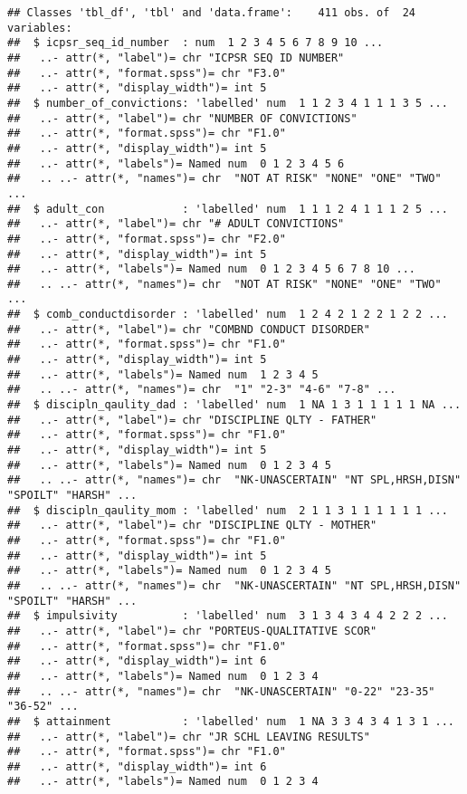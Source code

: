 \documentclass[]{tufte-handout}
\begin{document}
\begin{verbatim}
## Classes 'tbl_df', 'tbl' and 'data.frame':    411 obs. of  24 variables:
##  $ icpsr_seq_id_number  : num  1 2 3 4 5 6 7 8 9 10 ...
##   ..- attr(*, "label")= chr "ICPSR SEQ ID NUMBER"
##   ..- attr(*, "format.spss")= chr "F3.0"
##   ..- attr(*, "display_width")= int 5
##  $ number_of_convictions: 'labelled' num  1 1 2 3 4 1 1 1 3 5 ...
##   ..- attr(*, "label")= chr "NUMBER OF CONVICTIONS"
##   ..- attr(*, "format.spss")= chr "F1.0"
##   ..- attr(*, "display_width")= int 5
##   ..- attr(*, "labels")= Named num  0 1 2 3 4 5 6
##   .. ..- attr(*, "names")= chr  "NOT AT RISK" "NONE" "ONE" "TWO" ...
##  $ adult_con            : 'labelled' num  1 1 1 2 4 1 1 1 2 5 ...
##   ..- attr(*, "label")= chr "# ADULT CONVICTIONS"
##   ..- attr(*, "format.spss")= chr "F2.0"
##   ..- attr(*, "display_width")= int 5
##   ..- attr(*, "labels")= Named num  0 1 2 3 4 5 6 7 8 10 ...
##   .. ..- attr(*, "names")= chr  "NOT AT RISK" "NONE" "ONE" "TWO" ...
##  $ comb_conductdisorder : 'labelled' num  1 2 4 2 1 2 2 1 2 2 ...
##   ..- attr(*, "label")= chr "COMBND CONDUCT DISORDER"
##   ..- attr(*, "format.spss")= chr "F1.0"
##   ..- attr(*, "display_width")= int 5
##   ..- attr(*, "labels")= Named num  1 2 3 4 5
##   .. ..- attr(*, "names")= chr  "1" "2-3" "4-6" "7-8" ...
##  $ discipln_qaulity_dad : 'labelled' num  1 NA 1 3 1 1 1 1 1 NA ...
##   ..- attr(*, "label")= chr "DISCIPLINE QLTY - FATHER"
##   ..- attr(*, "format.spss")= chr "F1.0"
##   ..- attr(*, "display_width")= int 5
##   ..- attr(*, "labels")= Named num  0 1 2 3 4 5
##   .. ..- attr(*, "names")= chr  "NK-UNASCERTAIN" "NT SPL,HRSH,DISN" "SPOILT" "HARSH" ...
##  $ discipln_qaulity_mom : 'labelled' num  2 1 1 3 1 1 1 1 1 1 ...
##   ..- attr(*, "label")= chr "DISCIPLINE QLTY - MOTHER"
##   ..- attr(*, "format.spss")= chr "F1.0"
##   ..- attr(*, "display_width")= int 5
##   ..- attr(*, "labels")= Named num  0 1 2 3 4 5
##   .. ..- attr(*, "names")= chr  "NK-UNASCERTAIN" "NT SPL,HRSH,DISN" "SPOILT" "HARSH" ...
##  $ impulsivity          : 'labelled' num  3 1 3 4 3 4 4 2 2 2 ...
##   ..- attr(*, "label")= chr "PORTEUS-QUALITATIVE SCOR"
##   ..- attr(*, "format.spss")= chr "F1.0"
##   ..- attr(*, "display_width")= int 6
##   ..- attr(*, "labels")= Named num  0 1 2 3 4
##   .. ..- attr(*, "names")= chr  "NK-UNASCERTAIN" "0-22" "23-35" "36-52" ...
##  $ attainment           : 'labelled' num  1 NA 3 3 4 3 4 1 3 1 ...
##   ..- attr(*, "label")= chr "JR SCHL LEAVING RESULTS"
##   ..- attr(*, "format.spss")= chr "F1.0"
##   ..- attr(*, "display_width")= int 6
##   ..- attr(*, "labels")= Named num  0 1 2 3 4

\end{verbatim}
\end{document}
